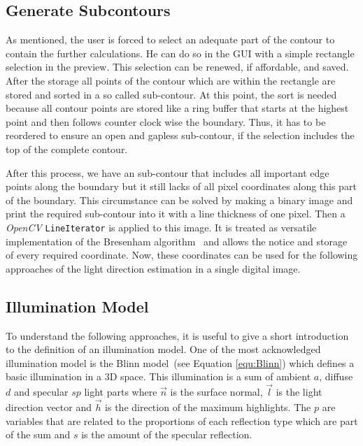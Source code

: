 \subsection{Generate Subcontours}\label{sec:subcontours}

As mentioned, the user is forced to select an adequate part of the contour to contain the further calculations. He can do so in the GUI with a simple rectangle selection in the preview. This selection can be renewed, if affordable, and saved. After the storage all points of the contour which are within the rectangle are stored and sorted in a so called  sub-contour. At this point, the sort is needed because all contour points are stored like a ring buffer that starts at the highest point and then follows counter clock wise the boundary. Thus, it has to be reordered to ensure an open and gapless sub-contour, if the selection includes the top of the complete contour.

After this process, we have an sub-contour that includes all important edge points along the boundary but it still lacks of all pixel coordinates along this part of the boundary.
This circumstance can be solved by making a binary image and print the required sub-contour into it with a line thickness of one pixel. Then a \textit{OpenCV} \texttt{LineIterator} is applied to this image. It is treated as versatile implementation of the Bresenham algorithm~\cite{5388473} and allows the notice and storage of every required coordinate. Now, these coordinates can be used for the following approaches of the light direction estimation in a single digital image.


\subsection{Illumination Model}\label{sec:lightingmodel}
To understand the following approaches, it is useful to give a short introduction to the definition of an illumination model. One of the most acknowledged illumination model is the Blinn model~\cite{Blinn:1977}(see Equation \ref{equ:Blinn}) which defines a basic illumination in a 3D space. This illumination is a sum of ambient $a$, diffuse $d$ and specular $sp$ light parts where $\vec{n}$ is the surface normal, $\vec{l}$ is the light direction vector and $\vec{h}$ is the direction of the maximum highlights. The $p$ are variables that are related to the proportions of each reflection type which are part of the sum and $s$ is the amount of the specular reflection.

